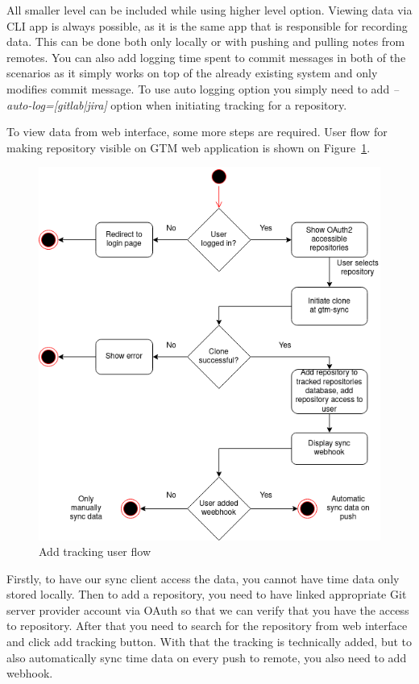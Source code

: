 All smaller level can be included while using higher level option.
Viewing data via CLI app is always possible, as it is the same app that is responsible for recording data.
This can be done both only locally or with pushing and pulling notes from remotes.
You can also add logging time spent to commit messages in both of the scenarios as it simply works on top of the already
existing system and only modifies commit message.
To use auto logging option you simply need to add \textit{--auto-log=[gitlab|jira]} option when initiating tracking for a repository.

To view data from web interface, some more steps are required.
User flow for making repository visible on GTM web application is shown on Figure~\ref{fig:add-tracking-user-flow}.

\begin{figure}[h]
    \includegraphics[width=\textwidth]{figures/add_repo_user_flow}
    \caption{Add tracking user flow}
    \label{fig:add-tracking-user-flow}
\end{figure}

Firstly, to have our sync client access the data, you cannot have time data only stored locally.
Then to add a repository, you need to have linked appropriate Git server provider account via OAuth so that we can
verify that you have the access to repository.
After that you need to search for the repository from web interface and click add tracking button.
With that the tracking is technically added, but to also automatically sync time data on every push to remote,
you also need to add webhook.

